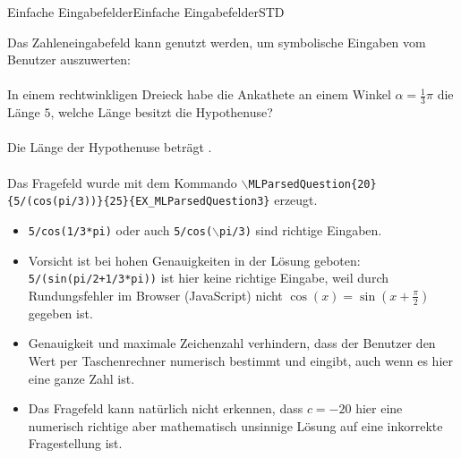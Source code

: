 \begin{MXContent}{Einfache Eingabefelder}{Einfache Eingabefelder}{STD}
\begin{MExample}
Das Zahleneingabefeld kann genutzt werden, um symbolische Eingaben vom Benutzer auszuwerten:
\ \\ \ \\
In einem rechtwinkligen Dreieck habe die Ankathete an einem Winkel $\alpha=\frac13\pi$ die Länge $5$, welche Länge besitzt die Hypothenuse?\ \\ \ \\
Die Länge der Hypothenuse beträgt .\ \\ \ \\
Das Fragefeld wurde mit dem Kommando \texttt{$\backslash$MLParsedQuestion\{20\}\{5/(cos(pi/3))\}\{25\}\{EX\_MLParsedQuestion3\}} erzeugt.
\ \\
\begin{itemize}
\item{\texttt{5/cos(1/3*pi)} oder auch \texttt{5/cos($\backslash$pi/3)} sind richtige Eingaben.}
\item{Vorsicht ist bei hohen Genauigkeiten in der Lösung geboten: \texttt{5/(sin(pi/2+1/3*pi))} ist hier keine richtige Eingabe, weil durch Rundungsfehler im Browser (JavaScript)
nicht $\cos(x)=\sin(x+\frac{\pi}{2})$ gegeben ist.}
\item{Genauigkeit und maximale Zeichenzahl verhindern, dass der Benutzer den Wert per Taschenrechner numerisch bestimmt und eingibt, auch wenn es hier eine ganze Zahl ist.}
\item{Das Fragefeld kann natürlich nicht erkennen, dass $c=-20$ hier eine numerisch richtige aber mathematisch unsinnige Lösung auf eine inkorrekte Fragestellung ist.}
\end{itemize}
\end{MExample}


\end{MXContent}
